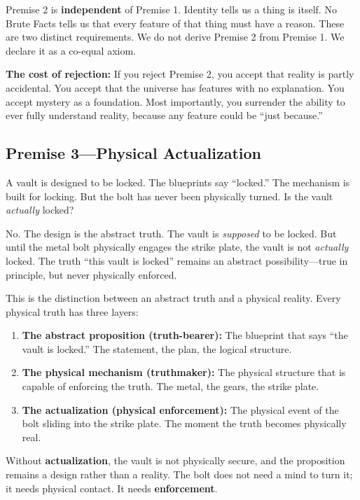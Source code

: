 \documentclass[11pt]{article}
\theoremstyle{canonstyle}
\begin{document}
Premise 2 is \textbf{independent} of Premise 1. Identity tells us a thing is itself. No Brute Facts tells us that every feature of that thing must have a reason. These are two distinct requirements. We do not derive Premise 2 from Premise 1. We declare it as a co-equal axiom.

\textbf{The cost of rejection:} If you reject Premise 2, you accept that reality is partly accidental. You accept that the universe has features with no explanation. You accept mystery as a foundation. Most importantly, you surrender the ability to ever fully understand reality, because any feature could be ``just because.''

\subsection{Premise 3---Physical Actualization}

\begin{reflect}
A vault is designed to be locked. The blueprints say ``locked.'' The mechanism is built for locking. But the bolt has never been physically turned. Is the vault \emph{actually} locked?
\end{reflect}

No. The design is the abstract truth. The vault is \emph{supposed} to be locked. But until the metal bolt physically engages the strike plate, the vault is not \emph{actually} locked. The truth ``this vault is locked'' remains an abstract possibility---true in principle, but never physically enforced.

This is the distinction between an abstract truth and a physical reality. Every physical truth has three layers:

\begin{enumerate}
    \item \textbf{The abstract proposition (truth-bearer):} The blueprint that says ``the vault is locked.'' The statement, the plan, the logical structure.
    \item \textbf{The physical mechanism (truthmaker):} The physical structure that is capable of enforcing the truth. The metal, the gears, the strike plate.
    \item \textbf{The actualization (physical enforcement):} The physical event of the bolt sliding into the strike plate. The moment the truth becomes physically real.
\end{enumerate}

Without \textbf{actualization}, the vault is not physically secure, and the proposition remains a design rather than a reality. The bolt does not need a mind to turn it; it needs physical contact. It needs \textbf{enforcement}.
\end{document}
